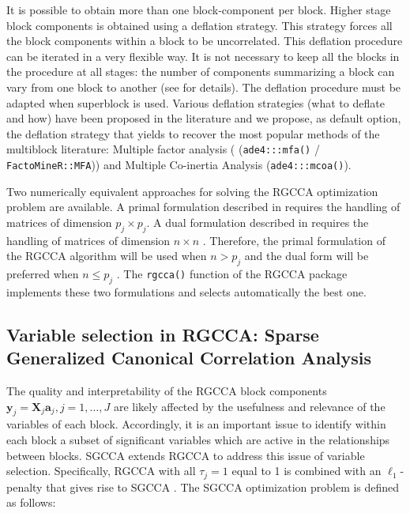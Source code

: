 \documentclass[
]{jss}
\begin{document}
\normalsize

It is possible to obtain more than one block-component per block. Higher
stage block components is obtained using a deflation strategy. This
strategy forces all the block components within a block to be
uncorrelated. This deflation procedure can be iterated in a very
flexible way. It is not necessary to keep all the blocks in the
procedure at all stages: the number of components summarizing a block
can vary from one block to another (see \citep{Tenenhaus2017} for
details). The deflation procedure must be adapted when superblock is
used. Various deflation strategies (what to deflate and how) have been
proposed in the literature and we propose, as default option, the
deflation strategy that yields to recover the most popular methods of
the multiblock literature: Multiple factor analysis (
(\texttt{ade4:::mfa()} / \texttt{FactoMineR::MFA})) and Multiple
Co-inertia Analysis (\texttt{ade4:::mcoa()}).

Two numerically equivalent approaches for solving the RGCCA optimization
problem are available. A primal formulation described in
\citetext{\citealp[ ]{Tenenhaus2017}; \citealp{Tenenhaus2011}} requires
the handling of matrices of dimension \(p_j \times p_j\). A dual
formulation described in \citep{Tenenhaus2015} requires the handling of
matrices of dimension \(n \times n\) . Therefore, the primal formulation
of the RGCCA algorithm will be used when \(n>p_j\) and the dual form
will be preferred when \(n\le p_j\) . The \texttt{rgcca()} function of
the RGCCA package implements these two formulations and selects
automatically the best one.

\hypertarget{variable-selection-in-rgcca-sparse-generalized-canonical-correlation-analysis}{%
\subsection{Variable selection in RGCCA: Sparse Generalized Canonical
Correlation
Analysis}\label{variable-selection-in-rgcca-sparse-generalized-canonical-correlation-analysis}}

The quality and interpretability of the RGCCA block components
\(\mathbf{y}_j= \mathbf{X}_j \ensuremath{\mathbf{a}}_j,j=1, \ldots,J\)
are likely affected by the usefulness and relevance of the variables of
each block. Accordingly, it is an important issue to identify within
each block a subset of significant variables which are active in the
relationships between blocks. SGCCA extends RGCCA to address this issue
of variable selection. Specifically, RGCCA with all \(\tau_j=1\) equal
to 1 is combined with an \(\ell_1\)-penalty that gives rise to SGCCA
\citep{Tenenhaus2014b}. The SGCCA optimization problem is defined as
follows:
\end{document}
